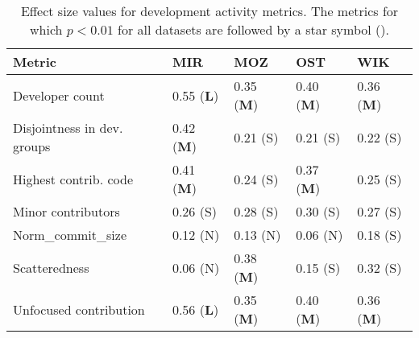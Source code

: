 \documentclass[smallextended]{svjour3}       %
\newcommand{\starsymbol}{\ding{74}}%
\begin{document}
\begin{table*}[]
\captionsetup{justification=centering}
\caption{Effect size values for development activity metrics. The metrics for which $p < 0.01$ for all datasets are followed by a star symbol (\starsymbol).} 
\label{table-res-rq1-effect}  
{\footnotesize
\begin{tabular}{p{4cm} p{1.25cm}  p{1.25cm} p{1.25cm}  p{1.25cm}  }
\hline
\textbf{Metric} & \textbf{MIR} & \textbf{MOZ} & \textbf{OST} & \textbf{WIK}\\
\hline
Developer count \starsymbol             & 0.55 (\textbf{L}) & 0.35 (\textbf{M})  & 0.40 (\textbf{M}) & 0.36 (\textbf{M})  \\
\hline 
Disjointness in dev. groups \starsymbol & 0.42 (\textbf{M})  & 0.21 (S)  & 0.21 (S) & 0.22 (S) \\
\hline 
Highest contrib. code \starsymbol       & 0.41 (\textbf{M})  & 0.24 (S)  & 0.37 (\textbf{M}) & 0.25 (S)  \\
\hline 
Minor contributors \starsymbol          & 0.26 (S) & 0.28 (S) & 0.30 (S) & 0.27 (S) \\
\hline 
Norm\_commit\_size                      & 0.12 (N) & 0.13 (N) & 0.06 (N) & 0.18 (S) \\
\hline 
Scatteredness                           & 0.06 (N) & 0.38 (\textbf{M}) & 0.15 (S) & 0.32 (S) \\
\hline 
Unfocused contribution \starsymbol      & 0.56 (\textbf{L}) & 0.35 (\textbf{M}) & 0.40 (\textbf{M}) &  0.36 (\textbf{M})  \\
\hline 
\end{tabular}
}
\end{table*}  

\end{document}
